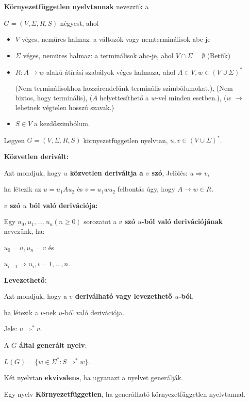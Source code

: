 \documentclass[10pt]{article}
\renewcommand{\\}{\par\noindent}
\begin{document}
\begin{frame}
\begin{tcolorbox}[title={Def.: Környezetfüggetlen nyelvtan}]
\textbf{Környezetfüggetlen nyelvtannak} nevezzük a\\
$G = (V, {\Sigma}, R, S)$ négyest, ahol\\
\begin{itemize}
\item $V$ véges, nemüres halmaz: a változók vagy nemterminálisok abc-je
\item $\Sigma$ véges, nemüres halmaz: a terminálisok abc-je, ahol $V \cap \Sigma = \emptyset$ (Betűk)
\item $R : A \rightarrow w$ alakú átírási szabályok véges halmaza, ahol $A \in V, w \in (V \cup {\Sigma})^*$\\
(Nem terminálisokhoz hozzárendelünk terminális szimbólumokat.), (Nem biztos, hogy terminális), ($A$ helyettesíthető a $w$-vel minden esetben.), ($w$ $\rightarrow$ lehetnek végtelen hosszú szavak.)
\item $S \in V$ a kezdőszimbólum.
\end{itemize}
\end{tcolorbox}

\begin{tcolorbox}[title={Def.: Deriváció, közvetlen derivált}]
Legyen $G = (V, {\Sigma}, R, S)$ környezetfüggetlen nyelvtan, $u, v \in (V \cup {\Sigma})^*$.\\
\medskip
\textbf{Közvetlen derivált:}\\
Azt mondjuk, hogy \textbf{$u$ közvetlen deriváltja a $v$ szó}, Jelölés: $u \Rightarrow v$,\\
ha létezik az $u = u_1Au_2$ és $v = u_1wu_2$ felbontás úgy, hogy $A  \rightarrow w \in R$.\\
\medskip
\textbf{$v$ szó $u$ ból való derivációja:}\\
Egy $u_0, u_1, ..., u_n (n \geq 0)$ sorozatot a \textbf{$v$ szó $u$-ból való derivációjának} nevezünk, ha:\\
$u_0 = u, u_n = v$ és\\
$u_{i - 1} \Rightarrow u_i, i = 1, ..., n$.\\
\medskip
\textbf{Levezethető:}\\
Azt mondjuk, hogy a \textbf{$v$ deriválható vagy levezethető $u$-ból},
\\ha létezik a $v$-nek $u$-ból való derivációja.\\
Jele: $u {\Rightarrow}^* v$.\\
\medskip
A \textbf{$G$ által generált nyelv}:\\
$L(G) = \{w \in {\Sigma}^* : S {\Rightarrow}^* w\}$.

\end{tcolorbox}

\begin{tcolorbox}[squeezed title={Def.: Nyelvtanok ekvivalenciája, Környezetfüggetlen nyelv}]
Két nyelvtan \textbf{ekvivalens}, ha ugyanazt a nyelvet generálják.\\
Egy nyelv \textbf{Környezetfüggetlen}, ha generálható környezetfüggetlen nyelvtannal.
\end{tcolorbox}

\end{frame}
\end{document}
